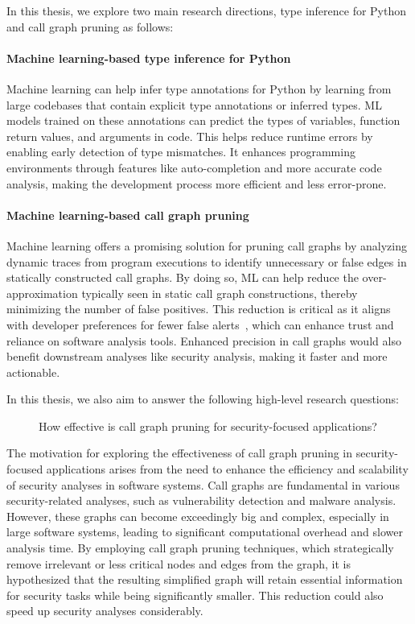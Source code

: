 In this thesis, we explore two main research directions, type inference for Python and call graph pruning as follows:

\paragraph{Machine learning-based type inference for Python}
Machine learning can help infer type annotations for Python by learning from large codebases that contain explicit type annotations or inferred types. ML models trained on these annotations can predict the types of variables, function return values, and arguments in code. This helps reduce runtime errors by enabling early detection of type mismatches. It enhances programming environments through features like auto-completion and more accurate code analysis, making the development process more efficient and less error-prone.

\paragraph{Machine learning-based call graph pruning}
Machine learning offers a promising solution for pruning call graphs by analyzing dynamic traces from program executions to identify unnecessary or false edges in statically constructed call graphs. By doing so, ML can help reduce the over-approximation typically seen in static call graph constructions, thereby minimizing the number of false positives. This reduction is critical as it aligns with developer preferences for fewer false alerts~\cite{christakis2016developers}, which can enhance trust and reliance on software analysis tools. Enhanced precision in call graphs would also benefit downstream analyses like security analysis, making it faster and more actionable.

In this thesis, we also aim to answer the following high-level research questions:

\begin{description}
    \item[] How effective is call graph pruning for security-focused applications?
\end{description}

\noindent
The motivation for exploring the effectiveness of call graph pruning in security-focused applications arises from the need to enhance the efficiency and scalability of security analyses in software systems. Call graphs are fundamental in various security-related analyses, such as vulnerability detection and malware analysis. However, these graphs can become exceedingly big and complex, especially in large software systems, leading to significant computational overhead and slower analysis time. By employing call graph pruning techniques, which strategically remove irrelevant or less critical nodes and edges from the graph, it is hypothesized that the resulting simplified graph will retain essential information for security tasks while being significantly smaller. This reduction could also speed up security analyses considerably.

